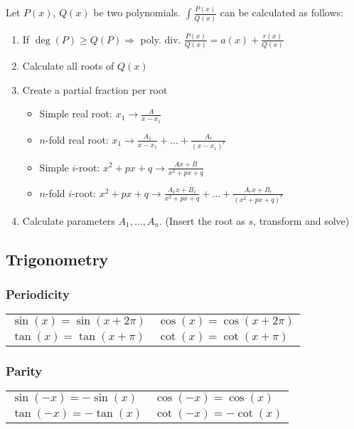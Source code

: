 \documentclass[a4paper, 10pt]{article}
\theoremstyle{definition}
\begin{document}
\begin{ntheorem*}
    Let $P(x)$, $Q(x)$ be two polynomials. $\int \frac{P(x)}{Q(x)}$ can be calculated as follows:
    \begin{enumerate}[leftmargin=5mm]
        \item If $\deg(P) \geq Q(P) \Rightarrow$ poly. div. $\frac{P(x)}{Q(x)} = a(x) + \frac{r(x)}{Q(x)}$
        \item Calculate all roots of $Q(x)$
        \item Create a partial fraction per root
        \begin{itemize}[leftmargin=1mm]
            \item Simple real root: $x_1 \to \frac{A}{x - x_1}$
            \item $n$-fold real root: $x_1 \to \frac{A_1}{x - x_1} + \ldots + \frac{A_r}{(x - x_1)^r}$
            \item Simple $i$-root: $x^2 + px + q \to \frac{Ax + B}{x^2 + px + q}$
            \item $n$-fold $i$-root: $x^2 + px + q \to \frac{A_1x + B_1}{x^2 + px + q} + \ldots + \frac{A_rx + B_r}{(x^2 + px + q)^r}$
        \end{itemize}
        \item Calculate parameters $A_1, \ldots, A_n$. (Insert the root as $s$, transform and solve)
    \end{enumerate}
\end{ntheorem*}

\subsection*{Trigonometry}

\subsubsection*{Periodicity}
\begin{tabularx}{\linewidth}{XX}
    $\sin(x) = \sin(x + 2 \pi)$ & $\cos(x) = \cos(x + 2\pi)$ \\
    $\tan(x) = \tan(x + \pi)$ & $\cot(x) = \cot(x + \pi)$
\end{tabularx}

\subsubsection*{Parity}
\begin{tabularx}{\linewidth}{XX}
    $\sin(-x) = - \sin(x)$ & $\cos(-x) = \cos(x)$ \\
    $\tan(-x) = - \tan(x)$ & $\cot(-x) = -\cot(x)$
\end{tabularx}
\end{document}

